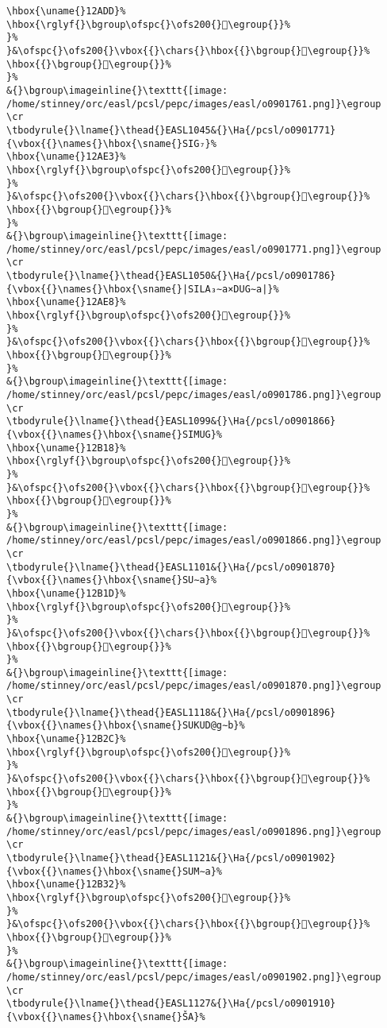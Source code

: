 \begin{verbatim}
\hbox{\uname{}12ADD}%
\hbox{\rglyf{}\bgroup\ofspc{}\ofs200{}𒫝\egroup{}}%
}%
}&\ofspc{}\ofs200{}\vbox{{}\chars{}\hbox{{}\bgroup{}𒫝\egroup{}}%
\hbox{{}\bgroup{}𒫞\egroup{}}%
}%
&{}\bgroup\imageinline{}\texttt{[image: /home/stinney/orc/easl/pcsl/pepc/images/easl/o0901761.png]}\egroup
\cr
\tbodyrule{}\lname{}\thead{}EASL1045&{}\Ha{/pcsl/o0901771}{\vbox{{}\names{}\hbox{\sname{}SIG₇}%
\hbox{\uname{}12AE3}%
\hbox{\rglyf{}\bgroup\ofspc{}\ofs200{}𒫣\egroup{}}%
}%
}&\ofspc{}\ofs200{}\vbox{{}\chars{}\hbox{{}\bgroup{}𒫣\egroup{}}%
\hbox{{}\bgroup{}𒫤\egroup{}}%
}%
&{}\bgroup\imageinline{}\texttt{[image: /home/stinney/orc/easl/pcsl/pepc/images/easl/o0901771.png]}\egroup
\cr
\tbodyrule{}\lname{}\thead{}EASL1050&{}\Ha{/pcsl/o0901786}{\vbox{{}\names{}\hbox{\sname{}|SILA₃∼a×DUG∼a|}%
\hbox{\uname{}12AE8}%
\hbox{\rglyf{}\bgroup\ofspc{}\ofs200{}𒫨\egroup{}}%
}%
}&\ofspc{}\ofs200{}\vbox{{}\chars{}\hbox{{}\bgroup{}𒬉\egroup{}}%
\hbox{{}\bgroup{}𒫨\egroup{}}%
}%
&{}\bgroup\imageinline{}\texttt{[image: /home/stinney/orc/easl/pcsl/pepc/images/easl/o0901786.png]}\egroup
\cr
\tbodyrule{}\lname{}\thead{}EASL1099&{}\Ha{/pcsl/o0901866}{\vbox{{}\names{}\hbox{\sname{}SIMUG}%
\hbox{\uname{}12B18}%
\hbox{\rglyf{}\bgroup\ofspc{}\ofs200{}𒬘\egroup{}}%
}%
}&\ofspc{}\ofs200{}\vbox{{}\chars{}\hbox{{}\bgroup{}𒬘\egroup{}}%
\hbox{{}\bgroup{}𒬙\egroup{}}%
}%
&{}\bgroup\imageinline{}\texttt{[image: /home/stinney/orc/easl/pcsl/pepc/images/easl/o0901866.png]}\egroup
\cr
\tbodyrule{}\lname{}\thead{}EASL1101&{}\Ha{/pcsl/o0901870}{\vbox{{}\names{}\hbox{\sname{}SU∼a}%
\hbox{\uname{}12B1D}%
\hbox{\rglyf{}\bgroup\ofspc{}\ofs200{}𒬝\egroup{}}%
}%
}&\ofspc{}\ofs200{}\vbox{{}\chars{}\hbox{{}\bgroup{}𒬛\egroup{}}%
\hbox{{}\bgroup{}𒬝\egroup{}}%
}%
&{}\bgroup\imageinline{}\texttt{[image: /home/stinney/orc/easl/pcsl/pepc/images/easl/o0901870.png]}\egroup
\cr
\tbodyrule{}\lname{}\thead{}EASL1118&{}\Ha{/pcsl/o0901896}{\vbox{{}\names{}\hbox{\sname{}SUKUD@g∼b}%
\hbox{\uname{}12B2C}%
\hbox{\rglyf{}\bgroup\ofspc{}\ofs200{}𒬬\egroup{}}%
}%
}&\ofspc{}\ofs200{}\vbox{{}\chars{}\hbox{{}\bgroup{}𒬬\egroup{}}%
\hbox{{}\bgroup{}𒬭\egroup{}}%
}%
&{}\bgroup\imageinline{}\texttt{[image: /home/stinney/orc/easl/pcsl/pepc/images/easl/o0901896.png]}\egroup
\cr
\tbodyrule{}\lname{}\thead{}EASL1121&{}\Ha{/pcsl/o0901902}{\vbox{{}\names{}\hbox{\sname{}SUM∼a}%
\hbox{\uname{}12B32}%
\hbox{\rglyf{}\bgroup\ofspc{}\ofs200{}𒬲\egroup{}}%
}%
}&\ofspc{}\ofs200{}\vbox{{}\chars{}\hbox{{}\bgroup{}𒬰\egroup{}}%
\hbox{{}\bgroup{}𒬲\egroup{}}%
}%
&{}\bgroup\imageinline{}\texttt{[image: /home/stinney/orc/easl/pcsl/pepc/images/easl/o0901902.png]}\egroup
\cr
\tbodyrule{}\lname{}\thead{}EASL1127&{}\Ha{/pcsl/o0901910}{\vbox{{}\names{}\hbox{\sname{}ŠA}%

\end{verbatim}
